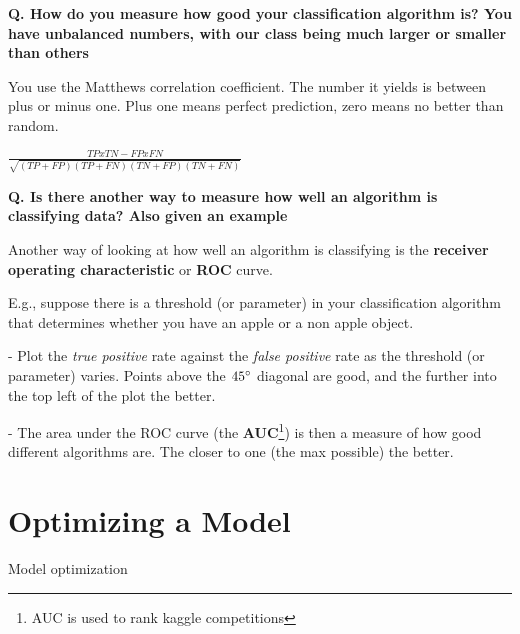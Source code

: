 \begin{frame}[fragile]{\textbf{Q. How do you measure how  good your
      classification algorithm is? You have unbalanced numbers, with our class
      being much larger or smaller than others}}
  \begin{wideitemize}
  \item You use the Matthews correlation coefficient. The number it yields is
    between plus or minus one. Plus one means perfect prediction, zero means no
    better than random.
  \item $\frac{TP x TN - FP x FN}{\sqrt{(TP + FP)(TP + FN)(TN + FP)(TN + FN)}}$
  \end{wideitemize}
\end{frame}


\begin{frame}[fragile]{\textbf{Q. Is there another way to measure how well an
      algorithm is classifying data? Also given an example}}
  \begin{wideitemize}
  \item Another way of looking at how well an algorithm is classifying is the
    \textbf{receiver operating characteristic} or \textbf{ROC} curve.
    \item E.g., suppose there is a threshold (or parameter) in your
      classification algorithm that determines whether you have an apple or a
      non apple object.
      \begin{wideitemize}
      \item[-] Plot the \textit{true positive} rate against the
        \textit{false positive} rate as the threshold (or parameter) varies.
        Points above the $45\degree$ diagonal are good, and the further
        into the top left of the plot the better.
      \item[-] The area under the ROC curve (the \textbf{AUC}\footnote{AUC is
          used to rank kaggle competitions}) is then a measure of how
        good different algorithms are. The closer to one (the max possible) the better.
      \end{wideitemize}
  \end{wideitemize}
\end{frame}

\section{Optimizing a Model}
\begin{transitionframe}
  \begin{center}
    \Huge Model optimization
  \end{center}
\end{transitionframe}

